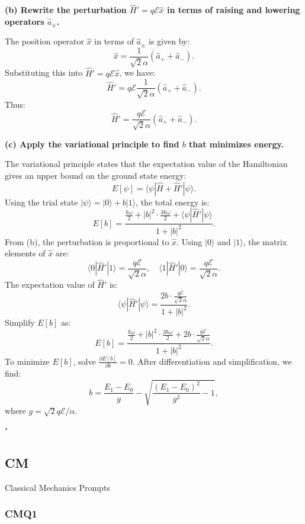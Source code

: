 \textbf{(b) Rewrite the perturbation \(\hat{H}' = q \mathcal{E} \hat{x}\) in terms of raising and lowering operators \(\hat{a}_\pm\).}

The position operator \(\hat{x}\) in terms of \(\hat{a}_\pm\) is given by:
\[
\hat{x} = \frac{1}{\sqrt{2} \alpha} (\hat{a}_+ + \hat{a}_-).
\]
Substituting this into \(\hat{H}' = q \mathcal{E} \hat{x}\), we have:
\[
\hat{H}' = q \mathcal{E} \frac{1}{\sqrt{2} \alpha} (\hat{a}_+ + \hat{a}_-).
\]
Thus:
\[
\hat{H}' = \frac{q \mathcal{E}}{\sqrt{2} \alpha} (\hat{a}_+ + \hat{a}_-).
\]

\textbf{(c) Apply the variational principle to find \(b\) that minimizes energy.}

The variational principle states that the expectation value of the Hamiltonian gives an upper bound on the ground state energy:
\[
E[\psi] = \langle \psi | \hat{H} + \hat{H}' | \psi \rangle.
\]
Using the trial state \(|\psi\rangle = |0\rangle + b |1\rangle\), the total energy is:
\[
E[b] = \frac{\frac{\hbar\omega}{2} + |b|^2 \cdot \frac{3\hbar\omega}{2} + \langle \psi | \hat{H}' | \psi \rangle}{1 + |b|^2}.
\]
From (b), the perturbation is proportional to \(\hat{x}\). Using \(|0\rangle\) and \(|1\rangle\), the matrix elements of \(\hat{x}\) are:
\[
\langle 0 | \hat{H}' | 1 \rangle = \frac{q \mathcal{E}}{\sqrt{2} \alpha}, \quad \langle 1 | \hat{H}' | 0 \rangle = \frac{q \mathcal{E}}{\sqrt{2} \alpha}.
\]
The expectation value of \(\hat{H}'\) is:
\[
\langle \psi | \hat{H}' | \psi \rangle = \frac{2 b \cdot \frac{q \mathcal{E}}{\sqrt{2} \alpha}}{1 + |b|^2}.
\]
Simplify \(E[b]\) as:
\[
E[b] = \frac{\frac{\hbar\omega}{2} + |b|^2 \cdot \frac{3\hbar\omega}{2} + 2b \cdot \frac{q \mathcal{E}}{\sqrt{2} \alpha}}{1 + |b|^2}.
\]
To minimize \(E[b]\), solve \(\frac{\partial E[b]}{\partial b} = 0\). After differentiation and simplification, we find:
\[
b = \frac{E_1 - E_0}{g} - \sqrt{\frac{(E_1 - E_0)^2}{g^2} - 1},
\]
where \(g = \sqrt{2} q \mathcal{E} / \alpha\).

"


\subsection{CM}

Classical Mechanics Prompts

\subsubsection{CMQ1}

